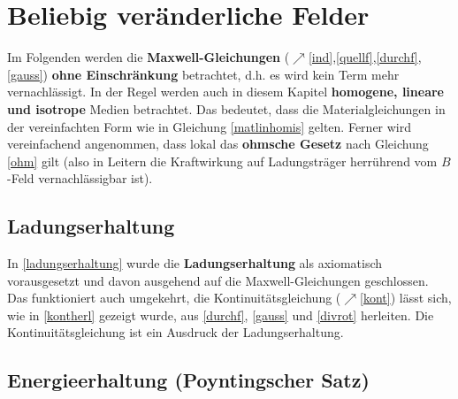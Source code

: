 \chapter{Beliebig veränderliche Felder}
Im Folgenden werden die \textbf{Maxwell-Gleichungen} ($\nearrow$\ref{ind},\ref{quellf},\ref{durchf},\ref{gauss}) \textbf{ohne Einschränkung} betrachtet, d.h. es wird kein Term mehr vernachlässigt. In der Regel werden auch in diesem Kapitel \textbf{homogene, lineare und isotrope} Medien betrachtet. Das bedeutet, dass die Materialgleichungen in der vereinfachten Form wie in Gleichung \ref{matlinhomis} gelten. Ferner wird vereinfachend angenommen, dass lokal das \textbf{ohmsche Gesetz} nach Gleichung \ref{ohm} gilt (also in Leitern die Kraftwirkung auf Ladungsträger herrührend vom $B$-Feld vernachlässigbar ist). 
 \section{Ladungserhaltung}
 In \ref{ladungserhaltung} wurde die \textbf{Ladungserhaltung} als axiomatisch vorausgesetzt und davon ausgehend auf die Maxwell-Gleichungen geschlossen. Das funktioniert auch umgekehrt, die Kontinuitätsgleichung  ($\nearrow$\ref{kont}) lässt sich, wie in \ref{kontherl} gezeigt wurde, aus \ref{durchf}, \ref{gauss} und \ref{divrot} herleiten. Die Kontinuitätsgleichung ist ein Ausdruck der Ladungserhaltung.
\section{Energieerhaltung (Poyntingscher Satz)}
